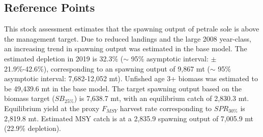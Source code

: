 \documentclass[12pt,]{article}
\begin{document}
\subsection*{Reference Points}\label{reference-points}

This stock assessment estimates that the spawning output of petrale sole
is above the management target. Due to reduced landings and the large
2008 year-class, an increasing trend in spawning output was estimated in
the base model. The estimated depletion in 2019 is 32.3\% (\(\sim\) 95\%
asymptotic interval: \(\pm\) 21.9\%-42.6\%), corresponding to an
spawning output of 9,867 mt (\(\sim\) 95\% asymptotic interval:
7,682-12,052 mt). Unfished age 3+ biomass was estimated to be 49,439.6
mt in the base model. The target spawning output based on the biomass
target (\(SB_{25\%}\)) is 7,638.7 mt, with an equilibrium catch of
2,830.3 mt. Equilibrium yield at the proxy \(F_{MSY}\) harvest rate
corresponding to \(SPR_{30\%}\) is 2,819.8 mt. Estimated MSY catch is at
a 2,835.9 spawning output of 7,005.9 mt (22.9\% depletion).
\end{document}
